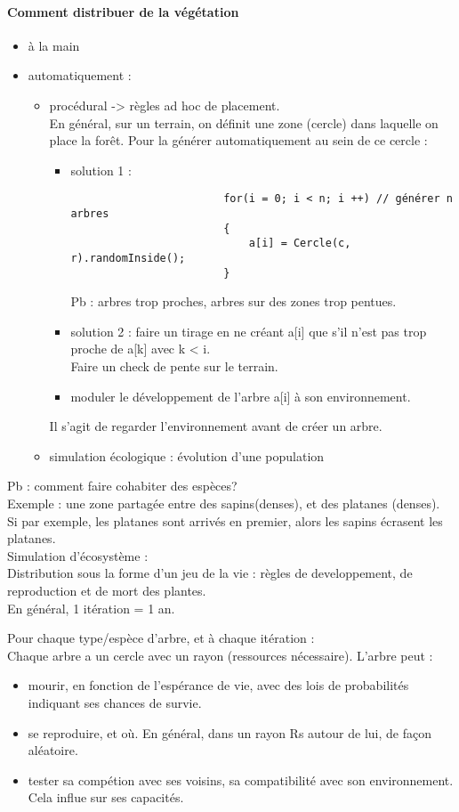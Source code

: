 \documentclass[11pt]{article}
\begin{document}
{\paragraph{Comment distribuer de la végétation}
\begin{itemize}
	\item à la main
	\item automatiquement :
		\begin{itemize}
			\item procédural -> règles ad hoc de placement.\\
				En général, sur un terrain, on définit une zone (cercle) dans laquelle on place la forêt. Pour la générer automatiquement au sein de ce cercle :
				\begin{itemize}
					\item solution 1 : \begin{verbatim}
						for(i = 0; i < n; i ++)	// générer n arbres
						{
							a[i] = Cercle(c, r).randomInside();
						}
					\end{verbatim}
					Pb : arbres trop proches, arbres sur des zones trop pentues.
				\item solution 2 : faire un tirage en ne créant a[i] que s'il n'est pas trop proche de a[k] avec k < i.\\
					Faire un check de pente sur le terrain.
				\item moduler le développement de l'arbre a[i] à son environnement.
				\end{itemize}
				Il s'agit de regarder l'environnement avant de créer un arbre.
			\item simulation écologique : évolution d'une population
		\end{itemize}
\end{itemize}
Pb : comment faire cohabiter des espèces?\\
Exemple : une zone partagée entre des sapins(denses), et des platanes (denses).\\
Si par exemple, les platanes sont arrivés en premier, alors les sapins écrasent les platanes.\\

Simulation d'écosystème :\\
Distribution sous la forme d'un jeu de la vie : règles de developpement, de reproduction et de mort des plantes.\\
En général, 1 itération = 1 an.


Pour chaque type/espèce d'arbre, et à chaque itération :\\
Chaque arbre a un cercle avec un rayon (ressources nécessaire). L'arbre peut :
\begin{itemize}
	\item mourir, en fonction de l'espérance de vie, avec des lois de probabilités indiquant ses chances de survie.
	\item se reproduire, et où. En général, dans un rayon Rs autour de lui, de façon aléatoire.
	\item tester sa compétion avec ses voisins, sa compatibilité avec son environnement. Cela influe sur ses capacités.
\end{itemize}

}
\end{document}
